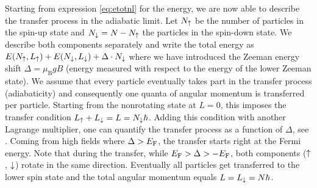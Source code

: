 Starting from expression \eqref{eq:etotnl} for the energy, we are now able to describe the transfer process in the adiabatic limit. Let $N_\uparrow$ be the number of particles in the spin-up state and $N_\downarrow = N-N_\uparrow$ the particles in the spin-down state. We describe both components separately and write the total energy as
$E(N_\uparrow,L_\uparrow) + E(N_\downarrow,L_\downarrow) + \Delta\cdot N_\downarrow$
where we have introduced the Zeeman energy shift $\Delta=\mu_\text{B} g B$ (energy measured with respect to the energy of the lower Zeeman state). We assume that every particle eventually takes part in the transfer process (adiabaticity) and consequently one quanta of angular momentum is transferred per particle. Starting from the nonrotating state at $L=0$, this imposes the transfer condition $L_\uparrow + L_\downarrow = L = N_\downarrow\hbar$. Adding this condition with another Lagrange multiplier, one can quantify the transfer process as a function of $\Delta$, see . Coming from high fields where $\Delta > E_\text{F}$, the transfer starts right at the Fermi energy. Note that during the transfer, while $E_\text{F} > \Delta > -E_\text{F}$, both components ($\uparrow$, $\downarrow$) rotate in the same direction. Eventually all particles get transferred to the lower spin state and the total angular momentum equals $L=L_\downarrow=N\hbar$.



